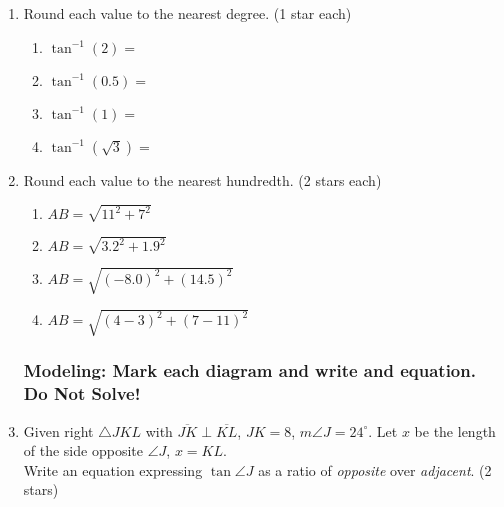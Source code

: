 \documentclass[12pt, twoside]{article}
\begin{document}
\begin{enumerate}
  \item Round each value to the nearest degree. \hfill (1 star each) \vspace{.5cm}
  \begin{multicols}{2}
    \begin{enumerate}
      \item $\tan^{-1} (2) = $ \vspace{1cm}
      \item $\tan^{-1} (0.5) =$
      \item $\tan^{-1} (1) = $ \vspace{1cm}
      \item $\tan^{-1} (\sqrt{3}) =$
    \end{enumerate}
  \end{multicols} \vspace{1cm}

  \item Round each value to the nearest hundredth. \hfill (2 stars each) \vspace{.5cm}
  \begin{multicols}{2}
    \begin{enumerate}
      \item $AB=\sqrt{11^2+7^2}$ \vspace{3.5cm}
      \item $AB=\sqrt{3.2^2+1.9^2}$
      \item $AB=\sqrt{(-8.0)^2+(14.5)^2}$ \vspace{3.5cm}
      \item $AB=\sqrt{(4-3)^2+(7-11)^2}$
    \end{enumerate}
  \end{multicols} \vspace{1cm}

    
    
\newpage  
\subsubsection*{Modeling: Mark each diagram and write and equation. Do Not Solve!}
  \item Given right $\triangle JKL$ with $\overline{JK} \perp \overline{KL}$, $JK=8$, $m\angle J=24^\circ$. Let $x$ be the length of the side opposite $\angle J$, $x=KL$.\\[0.5cm] 
  Write an equation expressing $\tan \angle J$ as a ratio of \emph{opposite} over \emph{adjacent}. \hfill (2 stars)
      \begin{flushright}
        \end{flushright}


\end{enumerate}
\end{document}
